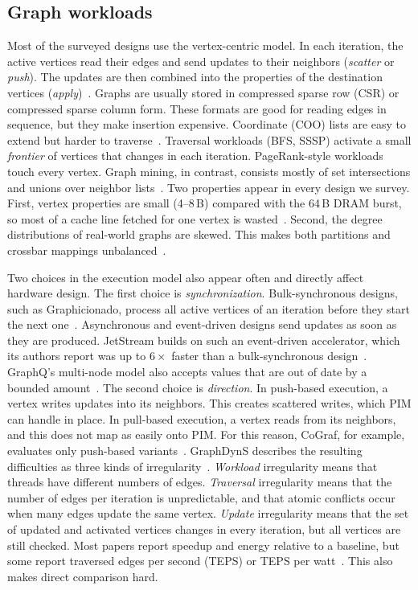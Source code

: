 \documentclass[journal,onecolumn]{IEEEtran}
\begin{document}
\subsection{Graph workloads}
Most of the surveyed designs use the vertex-centric model. In each iteration, the active vertices read their edges and send updates to their neighbors (\emph{scatter} or \emph{push}). The updates are then combined into the properties of the destination vertices (\emph{apply})~\cite{ham2016graphicionado,yenimol2026cograf}. Graphs are usually stored in compressed sparse row (CSR) or compressed sparse column form. These formats are good for reading edges in sequence, but they make insertion expensive. Coordinate (COO) lists are easy to extend but harder to traverse~\cite{asquini2025tc}. Traversal workloads (BFS, SSSP) activate a small \emph{frontier} of vertices that changes in each iteration. PageRank-style workloads touch every vertex. Graph mining, in contrast, consists mostly of set intersections and unions over neighbor lists~\cite{besta2021sisa}. Two properties appear in every design we survey. First, vertex properties are small (4--8\,B) compared with the 64\,B DRAM burst, so most of a cache line fetched for one vertex is wasted~\cite{shin2025piccolo}. Second, the degree distributions of real-world graphs are skewed. This makes both partitions and crossbar mappings unbalanced~\cite{zheng2020spara,cai2024pimpam}.

Two choices in the execution model also appear often and directly affect hardware design. The first choice is \emph{synchronization}. Bulk-synchronous designs, such as Graphicionado, process all active vertices of an iteration before they start the next one~\cite{ham2016graphicionado}. Asynchronous and event-driven designs send updates as soon as they are produced. JetStream builds on such an event-driven accelerator, which its authors report was up to $6\times$ faster than a bulk-synchronous design~\cite{rahman2021jetstream}. GraphQ's multi-node model also accepts values that are out of date by a bounded amount~\cite{zhuo2019graphq}. The second choice is \emph{direction}. In push-based execution, a vertex writes updates into its neighbors. This creates scattered writes, which PIM can handle in place. In pull-based execution, a vertex reads from its neighbors, and this does not map as easily onto PIM. For this reason, CoGraf, for example, evaluates only push-based variants~\cite{yenimol2026cograf}. GraphDynS describes the resulting difficulties as three kinds of irregularity~\cite{yan2019graphdyns}. \emph{Workload} irregularity means that threads have different numbers of edges. \emph{Traversal} irregularity means that the number of edges per iteration is unpredictable, and that atomic conflicts occur when many edges update the same vertex. \emph{Update} irregularity means that the set of updated and activated vertices changes in every iteration, but all vertices are still checked. Most papers report speedup and energy relative to a baseline, but some report traversed edges per second (TEPS) or TEPS per watt~\cite{lee2022graphwave}. This also makes direct comparison hard.
\end{document}

